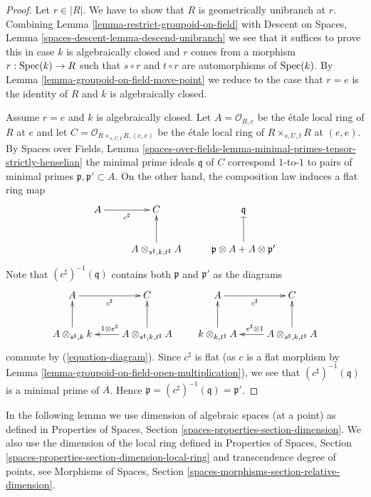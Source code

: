 \begin{proof}
Let $r \in |R|$. We have to show that $R$ is geometrically unibranch
at $r$. Combining
Lemma \ref{lemma-restrict-groupoid-on-field}
with
Descent on Spaces, Lemma \ref{spaces-descent-lemma-descend-unibranch}
we see that it suffices to prove this in case $k$ is algebraically closed
and $r$ comes from a morphism $r : \mathop{\rm Spec}(k) \to R$ such that
$s \circ r$ and $t \circ r$
are automorphisms of $\mathop{\rm Spec}(k)$. By
Lemma \ref{lemma-groupoid-on-field-move-point}
we reduce to the case that $r = e$ is the identity of $R$ and $k$ is
algebraically closed.

\medskip\noindent
Assume $r = e$ and $k$ is algebraically closed. Let
$A = \mathcal{O}_{R, e}$ be the \'etale local ring of
$R$ at $e$ and let
$C = \mathcal{O}_{R \times_{s, U, t} R, (e, e)}$
be the \'etale local ring of $R \times_{s, U, t} R$ at $(e, e)$.
By
Spaces over Fields, Lemma
\ref{spaces-over-fields-lemma-minimal-primes-tensor-strictly-henselian}
the minimal prime ideals $\mathfrak q$ of $C$ correspond $1$-to-$1$
to pairs of minimal primes $\mathfrak p, \mathfrak p' \subset A$.
On the other hand, the composition law induces a flat ring map
$$
\xymatrix{
A \ar[r]_{c^\sharp} & C & \mathfrak q \\
& A \otimes_{s^\sharp, k, t^\sharp} A \ar[u] &
\mathfrak p \otimes A + A \otimes \mathfrak p' \ar@{|}[u]
}
$$
Note that $(c^\sharp)^{-1}(\mathfrak q)$ contains both $\mathfrak p$ and
$\mathfrak p'$ as the diagrams
$$
\xymatrix{
A \ar[r]_{c^\sharp} & C \\
A \otimes_{s^\sharp, k} k \ar[u] &
A \otimes_{s^\sharp, k, t^\sharp} A \ar[l]_{1 \otimes e^\sharp} \ar[u]
}
\quad\quad
\xymatrix{
A \ar[r]_{c^\sharp} & C \\
k \otimes_{k, t^\sharp} A \ar[u] &
A \otimes_{s^\sharp, k, t^\sharp} A \ar[l]_{e^\sharp \otimes 1} \ar[u]
}
$$
commute by (\ref{equation-diagram}).
Since $c^\sharp$ is flat (as $c$ is a flat morphism by
Lemma \ref{lemma-groupoid-on-field-open-multiplication}),
we see that $(c^\sharp)^{-1}(\mathfrak q)$ is a minimal prime
of $A$. Hence $\mathfrak p = (c^\sharp)^{-1}(\mathfrak q) = \mathfrak p'$.
\end{proof}

\noindent
In the following lemma we use dimension of algebraic spaces (at a point)
as defined in
Properties of Spaces, Section \ref{spaces-properties-section-dimension}.
We also use the dimension of the local ring defined in
Properties of Spaces, Section
\ref{spaces-properties-section-dimension-local-ring}
and transcendence degree of points, see
Morphisms of Spaces, Section \ref{spaces-morphisms-section-relative-dimension}.


